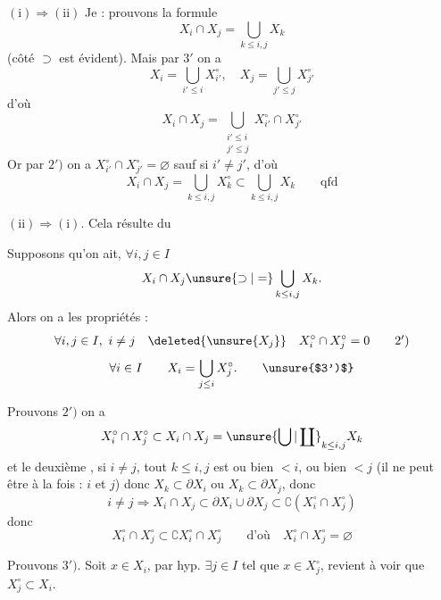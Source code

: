 
$(\mathrm{i})\Longrightarrow(\mathrm{ii})$ Je  : prouvons la formule
\[
X_i\cap X_j=\bigcup_{k\leq i,j}X_k
\]
(côté $\supset$ est évident). Mais par $3'$ on a
\[
X_i=\bigcup_{i'\leq i}X_{i'}^\circ,\quad X_j=\bigcup_{j'\leq j}X_{j'}^\circ
\]
d'où
\[
X_i\cap X_j=\bigcup_{\substack{i'\leq i\\j'\leq j}}X_{i'}^\circ\cap X_{j'}^\circ
\]
Or par $2')$ on a $X_{i'}^\circ\cap X_{j'}^\circ=\varnothing$ sauf si $i'\ne j'$, d'où
\[
X_i\cap X_j=\bigcup_{k\leq i,j}X_k^\circ\subset\bigcup_{k\leq i,j}X_k\qquad\text{qfd}
\]

$(\mathrm{ii})\Longrightarrow(\mathrm{i})$. Cela résulte du

  Supposons qu'on ait, $\forall i,j\in I$
\[
X_i\cap X_j\unsure{\supset|=}\bigcup_{k\leq i,j}X_k.
\]
Alors on a les propriétés :
\[
\forall i,j\in I,\ i\ne j\quad\deleted{\unsure{X_j}}\quad X_i^\circ\cap X_j^\circ=0\tag*{$2')$}
\]
\[
\forall i\in I\qquad X_i=\bigcup_{j\leq i}X_j^\circ.\tag*{\unsure{$3')$}}
\]

Prouvons $2')$ on a 
\[
X_i^\circ\cap X_j^\circ\subset X_i\cap X_j=\unsure{\bigcup|\coprod}_{k\leq i,j}X_k
\]
et le deuxième , si $i\ne j$,  tout $k\leq i,j$ est ou bien $<i$, ou bien $<j$ (il ne peut être  à la fois : $i$ et $j$) donc  $X_k\subset\partial X_i$ ou $X_k\subset\partial X_j$, donc
\[
i\ne j\Longrightarrow X_i\cap X_j\subset\partial X_i\cup\partial X_j\subset\complement(X_i^\circ\cap X_j^\circ)
\]
donc
\[
X_i^\circ\cap X_j^\circ\subset\complement X_i^\circ\cap X_j^\circ\qquad\text{d'où}\quad X_i^\circ\cap X_j^\circ=\varnothing
\]

Prouvons $3')$.  Soit $x\in X_i$, par hyp. $\exists j\in I$ tel que $x\in X_j^\circ$,  revient à voir que $X_j^\circ\subset X_i$.
